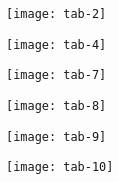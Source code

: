 \begin{frame}[plain]
\begin{center}
\texttt{[image: tab-2]}
\end{center}
\end{frame}
\begin{frame}[plain]
\begin{center}
\texttt{[image: tab-4]}
\end{center}
\end{frame}
\begin{frame}[plain]
\begin{center}
\texttt{[image: tab-7]}
\end{center}
\end{frame}
\begin{frame}[plain]
\begin{center}
\texttt{[image: tab-8]}
\end{center}
\end{frame}
\begin{frame}[plain]
\begin{center}
\texttt{[image: tab-9]}
\end{center}
\end{frame}
\begin{frame}[plain]
\begin{center}
\texttt{[image: tab-10]}
\end{center}
\end{frame}

